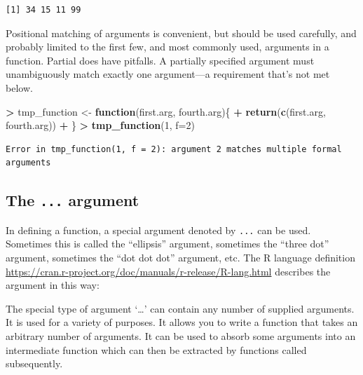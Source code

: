 \documentclass[
]{krantz}
\makeatletter
\newenvironment{Shaded}{\begin{snugshade}}{\end{snugshade}}
\newcommand{\ControlFlowTok}[1]{\textcolor[rgb]{0.27,0.27,0.27}{\textbf{#1}}}
\newcommand{\DataTypeTok}[1]{\textcolor[rgb]{0.27,0.27,0.27}{#1}}
\newcommand{\DecValTok}[1]{\textcolor[rgb]{0.06,0.06,0.06}{#1}}
\newcommand{\KeywordTok}[1]{\textcolor[rgb]{0.27,0.27,0.27}{\textbf{#1}}}
\newcommand{\NormalTok}[1]{#1}
\newcommand{\OperatorTok}[1]{\textcolor[rgb]{0.43,0.43,0.43}{\textbf{#1}}}
\newcommand{\StringTok}[1]{\textcolor[rgb]{0.5,0.5,0.5}{#1}}
\renewenvironment{quote}{\begin{VF}}{\end{VF}}
\newenvironment{kframe}{%
\medskip{}
\setlength{\fboxsep}{.8em}
 \def\at@end@of@kframe{}%
 \ifinner\ifhmode%
  \def\at@end@of@kframe{\end{minipage}}%
  \begin{minipage}{\columnwidth}%
 \fi\fi%
 \def\FrameCommand##1{\hskip\@totalleftmargin \hskip-\fboxsep
 \colorbox{shadecolor}{##1}\hskip-\fboxsep
     \hskip-\linewidth \hskip-\@totalleftmargin \hskip\columnwidth}%
 \MakeFramed {\advance\hsize-\width
   \@totalleftmargin\z@ \linewidth\hsize
   \@setminipage}}%
 {\par\unskip\endMakeFramed%
 \at@end@of@kframe}
\renewenvironment{Shaded}{\begin{kframe}}{\end{kframe}}
\makeatother
\begin{document}
\begin{verbatim}
[1] 34 15 11 99
\end{verbatim}

Positional matching of arguments is convenient, but should be used carefully, and probably limited to the first few, and most commonly used, arguments in a function. Partial does have pitfalls. A partially specified argument must unambiguously match exactly one argument---a requirement that's not met below.

\begin{Shaded}
\begin{Highlighting}[]
\OperatorTok{\textgreater{}}\StringTok{ }\NormalTok{tmp\_function \textless{}{-}}\StringTok{ }\ControlFlowTok{function}\NormalTok{(first.arg, fourth.arg)\{}
\OperatorTok{+}\StringTok{     }\KeywordTok{return}\NormalTok{(}\KeywordTok{c}\NormalTok{(first.arg, fourth.arg))}
\OperatorTok{+}\StringTok{ }\NormalTok{\}}
\OperatorTok{\textgreater{}}\StringTok{ }\KeywordTok{tmp\_function}\NormalTok{(}\DecValTok{1}\NormalTok{, }\DataTypeTok{f=}\DecValTok{2}\NormalTok{)}
\end{Highlighting}
\end{Shaded}

\begin{verbatim}
Error in tmp_function(1, f = 2): argument 2 matches multiple formal arguments
\end{verbatim}

\hypertarget{the-...-argument}{%
\subsection{\texorpdfstring{The \texttt{...} argument}{The ... argument}}\label{the-...-argument}}

In defining a function, a special argument denoted by \texttt{...} can be used. Sometimes this is called the ``ellipsis'' argument, sometimes the ``three dot'' argument, sometimes the ``dot dot dot'' argument, etc. The R language definition \url{https://cran.r-project.org/doc/manuals/r-release/R-lang.html} describes the argument in this way:

\begin{quote}
The special type of argument `\ldots' can contain any number of supplied arguments. It is used for a variety of purposes. It allows you to write a function that takes an arbitrary number of arguments. It can be used to absorb some arguments into an intermediate function which can then be extracted by functions called subsequently.
\end{quote}
\end{document}
